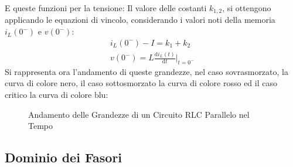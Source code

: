 \documentclass{article}
\newcommand{\df}{\mathrm{d}}
\numberwithin{equation}{subsection}
\begin{document}
E queste funzioni per la tensione:
Il valore delle costanti $k_{1,2}$, si ottengono applicando le equazioni di vincolo, considerando i valori noti della memoria $i_L(0^-)$ e $v(0^-)$:
\begin{gather*}
    i_L(0^-)-I=k_1+k_2\\
    v(0^-)=L\displaystyle\frac{\df i_L(t)}{\df t}\bigg|_{t={0^-}}
\end{gather*}
Si rappresenta ora l'andamento di queste grandezze, nel caso sovrasmorzato, la curva di colore nero, il caso sottosmorzato la curva di colore rosso ed il caso critico la curva 
di colore blu: 
\begin{figure}[H]%
    \centering
    \qquad
    \caption{Andamento delle Grandezze di un Circuito RLC Parallelo nel Tempo}
    \label{fig:andamento-rlc-parellelo}
\end{figure}

\subsection{Dominio dei Fasori}
\end{document}

